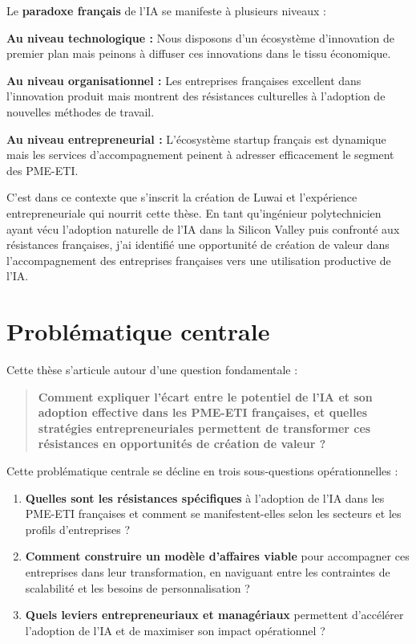 \documentclass[12pt,a4paper]{report}
\begin{document}
Le \textbf{paradoxe français} de l'IA se manifeste à plusieurs niveaux :

\textbf{Au niveau technologique :} Nous disposons d'un écosystème d'innovation de premier plan mais peinons à diffuser ces innovations dans le tissu économique.

\textbf{Au niveau organisationnel :} Les entreprises françaises excellent dans l'innovation produit mais montrent des résistances culturelles à l'adoption de nouvelles méthodes de travail.

\textbf{Au niveau entrepreneurial :} L'écosystème startup français est dynamique mais les services d'accompagnement peinent à adresser efficacement le segment des PME-ETI.

C'est dans ce contexte que s'inscrit la création de Luwai et l'expérience entrepreneuriale qui nourrit cette thèse. En tant qu'ingénieur polytechnicien ayant vécu l'adoption naturelle de l'IA dans la Silicon Valley puis confronté aux résistances françaises, j'ai identifié une opportunité de création de valeur dans l'accompagnement des entreprises françaises vers une utilisation productive de l'IA.

\section{Problématique centrale}

Cette thèse s'articule autour d'une question fondamentale :

\begin{quote}
\textbf{Comment expliquer l'écart entre le potentiel de l'IA et son adoption effective dans les PME-ETI françaises, et quelles stratégies entrepreneuriales permettent de transformer ces résistances en opportunités de création de valeur ?}
\end{quote}

Cette problématique centrale se décline en trois sous-questions opérationnelles :

\begin{enumerate}
\item \textbf{Quelles sont les résistances spécifiques} à l'adoption de l'IA dans les PME-ETI françaises et comment se manifestent-elles selon les secteurs et les profils d'entreprises ?

\item \textbf{Comment construire un modèle d'affaires viable} pour accompagner ces entreprises dans leur transformation, en naviguant entre les contraintes de scalabilité et les besoins de personnalisation ?

\item \textbf{Quels leviers entrepreneuriaux et managériaux} permettent d'accélérer l'adoption de l'IA et de maximiser son impact opérationnel ?
\end{enumerate}
\end{document}
